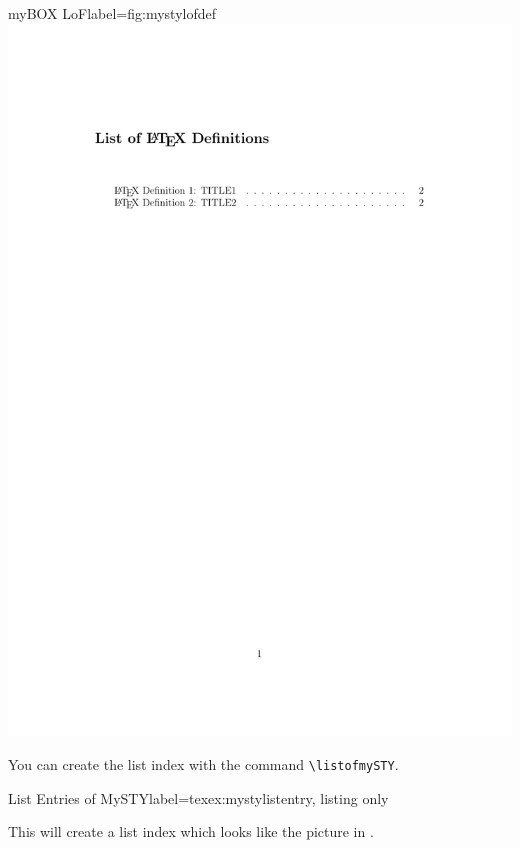 \documentclass[]{myHOWTO-V001}
\begin{document}
\begin{minipage}{0.46\linewidth}
\centering
\begin{myFIGlst}{myBOX LoF}{label={fig:mystylofdef}}
	\includegraphics[page=1,scale=0.18]{examples/mySTYV000.pdf}
\end{myFIGlst}
\end{minipage}
\begin{minipage}{0.46\linewidth}
You can create the list index with the command \Verb|\listofmySTY|.

\begin{myTEXEXdoclst}{List Entries of MySTY}{label={texex:mystylistentry}, listing only}
\listofmySTY
\end{myTEXEXdoclst}

This will create a list index which looks like the picture in . 
\end{minipage}
\end{document}

